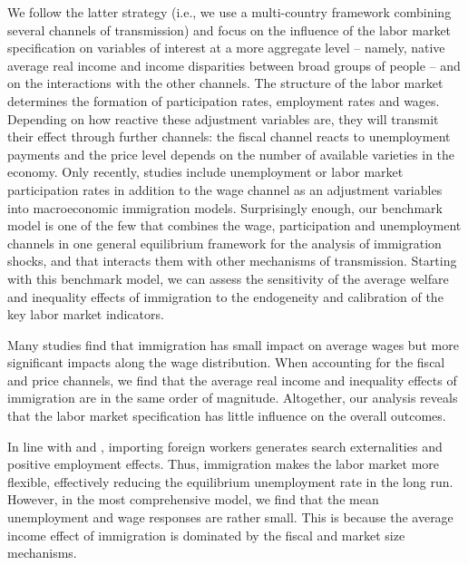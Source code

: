 \documentclass[a4paper,12pt]{article}
\begin{document}
We follow the latter strategy (i.e., we use a multi-country framework combining several channels of transmission) and focus on the influence of the labor market specification on variables of interest at a more aggregate level -- namely, native average real income and income disparities between broad groups of people -- and on the interactions with the other channels. The structure of the labor market determines the formation of participation rates, employment rates and wages. Depending on how reactive these adjustment variables are, they will transmit their effect through further channels: the fiscal channel reacts to unemployment payments and the price level depends on the number of available varieties in the economy. Only recently, studies include unemployment  \citep{Chassamboulli2014, Battisti2018} or labor market participation rates \citep{Burzynski2018} in addition to the wage channel as an adjustment variables into macroeconomic immigration models. Surprisingly enough, our benchmark model is one of the few that combines the wage, participation and unemployment channels in one general equilibrium framework for the analysis of immigration shocks, and that interacts them with other mechanisms of transmission. Starting with this benchmark model, we can assess the sensitivity of the average welfare and inequality effects of immigration to the endogeneity and calibration of the key labor market indicators.

Many studies find that immigration has small impact on average wages but more significant impacts along the wage distribution. When accounting for the fiscal and price channels, we find that the average real income and inequality effects of immigration are in the same order of magnitude. Altogether, our analysis reveals that the labor market specification has little influence on the overall outcomes.

In line with \citet{Chassamboulli2014} and \citet{Battisti2018}, importing foreign workers generates search externalities and positive employment effects. Thus, immigration makes the labor market more flexible, effectively reducing the equilibrium unemployment rate in the long run. However, in the most comprehensive model, we find that the mean unemployment and wage responses are rather small. This is because the average income effect of immigration is dominated by the fiscal and market size mechanisms. 
\end{document}
